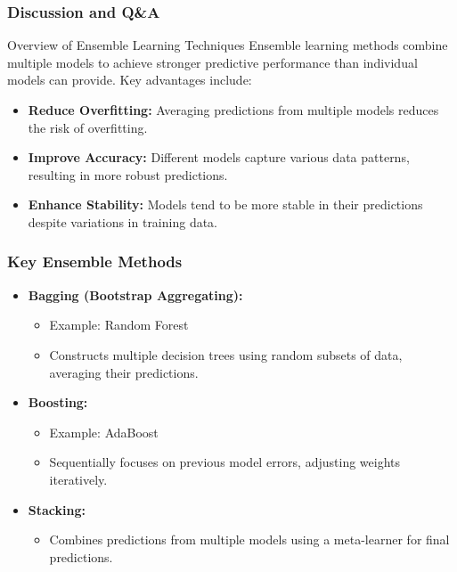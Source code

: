 \documentclass[aspectratio=169]{beamer}
\begin{document}
\begin{frame}[fragile]
    \frametitle{Discussion and Q\&A}
    \begin{block}{Overview of Ensemble Learning Techniques}
        Ensemble learning methods combine multiple models to achieve stronger predictive performance than individual models can provide. Key advantages include:
        \begin{itemize}
            \item \textbf{Reduce Overfitting:} Averaging predictions from multiple models reduces the risk of overfitting.
            \item \textbf{Improve Accuracy:} Different models capture various data patterns, resulting in more robust predictions.
            \item \textbf{Enhance Stability:} Models tend to be more stable in their predictions despite variations in training data.
        \end{itemize}
    \end{block}
\end{frame}

\begin{frame}[fragile]
    \frametitle{Key Ensemble Methods}
    \begin{itemize}
        \item \textbf{Bagging (Bootstrap Aggregating):}
            \begin{itemize}
                \item Example: Random Forest
                \item Constructs multiple decision trees using random subsets of data, averaging their predictions.
            \end{itemize}
        
        \item \textbf{Boosting:}
            \begin{itemize}
                \item Example: AdaBoost
                \item Sequentially focuses on previous model errors, adjusting weights iteratively.
            \end{itemize}
        
        \item \textbf{Stacking:}
        \begin{itemize}
            \item Combines predictions from multiple models using a meta-learner for final predictions.
        \end{itemize}
    \end{itemize}
\end{frame}
\end{document}
